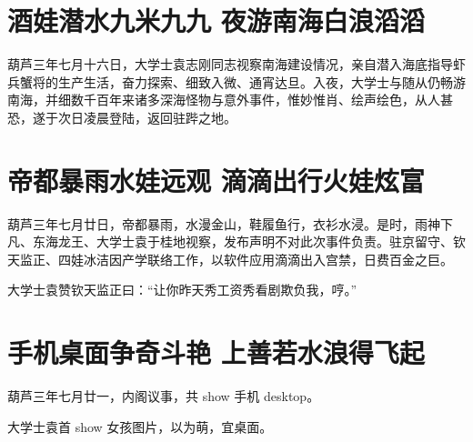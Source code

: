 \documentclass[12pt, a4paper]{book}
\begin{document}
\begin{CJK}{UTF8}{gbsn}
    \chapter{酒娃潜水九米九九 夜游南海白浪滔滔}
    
    葫芦三年七月十六日，大学士袁志刚同志视察南海建设情况，亲自潜入海底指导虾兵蟹将的生产生活，奋力探索、细致入微、通宵达旦。入夜，大学士与随从仍畅游南海，并细数千百年来诸多深海怪物与意外事件，惟妙惟肖、绘声绘色，从人甚恐，遂于次日凌晨登陆，返回驻跸之地。
    
    \chapter{帝都暴雨水娃远观 滴滴出行火娃炫富}
    
    葫芦三年七月廿日，帝都暴雨，水漫金山，鞋履鱼行，衣衫水浸。是时，雨神下凡、东海龙王、大学士袁于桂地视察，发布声明不对此次事件负责。驻京留守、钦天监正、四娃冰洁因产学联络工作，以软件应用滴滴出入宫禁，日费百金之巨。
    
    大学士袁赞钦天监正曰：“让你昨天秀工资秀看剧欺负我，哼。”
    
    \chapter{手机桌面争奇斗艳 上善若水浪得飞起}

    葫芦三年七月廿一，内阁议事，共 show 手机 desktop。

    大学士袁首 show 女孩图片，以为萌，宜桌面。


\end{CJK}
\end{document}
